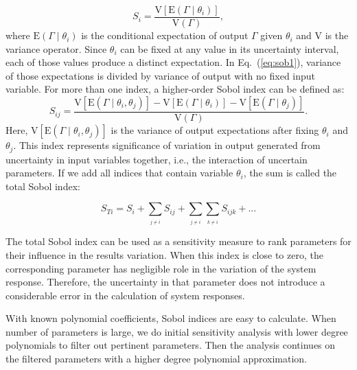 \begin{equation}
S_{i}=\frac{\mbox{V}[\mbox{E}(\Gamma\mid\theta_{i})]}{\mbox{V}(\Gamma)},\label{eq:sob1}\end{equation} where $\mbox{E}(\Gamma\mid\theta_{i})$ is the conditional expectation of output $\Gamma$ given $\theta_{i}$ and $\mbox{V}$ is the variance operator. Since $\theta_{i}$ can be fixed at any value in its uncertainty interval, each of those values produce a distinct expectation. In Eq.~(\ref{eq:sob1}), variance of those expectations is divided by variance of output with no fixed input variable. For more than one index, a higher-order Sobol index can be defined as:\begin{equation} S_{ij}=\frac{\mbox{V}[\mbox{E}(\Gamma\mid\theta_{i},\theta_{j})]-\mbox{V}[\mbox{E}(\Gamma\mid\theta_{i})]-\mbox{V}[\mbox{E}(\Gamma\mid\theta_{j})]}{\mbox{V}(\Gamma)}.\label{eq:sob2}\end{equation} Here, $\mbox{V}[\mbox{E}(\Gamma\mid\theta_{i},\theta_{j})]$ is the variance of output expectations after fixing $\theta_{i}$ and $\theta_{j}$. This index represents significance of variation in output generated from uncertainty in input variables together, i.e., the interaction of uncertain parameters. If we add all indices that contain variable $\theta_{i}$, the sum is called the total Sobol index:

\begin{equation}
S_{Ti}=S_{i}+\underset{_{j\neq i}}{\sum}S_{ij}+\underset{_{j\neq i}}{\sum}\underset{_{k\neq i}}{\sum}S_{ijk}+...\label{eq:totSob}\end{equation}


The total Sobol index can be used as a sensitivity measure to rank parameters for their influence in the results variation. When this index is close to zero, the corresponding parameter has negligible role in the variation of the system response. Therefore, the uncertainty in that parameter does not introduce a considerable error in the calculation of system responses. 

With known polynomial coefficients, Sobol indices are easy to calculate. When number of parameters is large, we do initial sensitivity analysis with lower degree polynomials to filter out pertinent parameters. Then the analysis continues on the filtered parameters with a higher
degree polynomial approximation.

